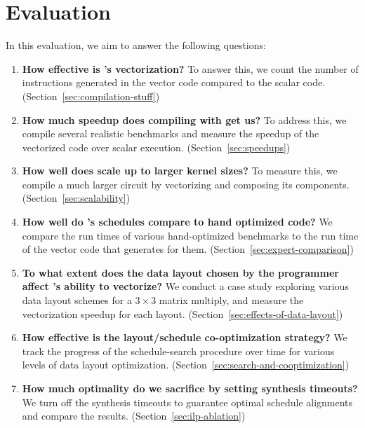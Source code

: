 \section{Evaluation}\label{sec:eval}


In this evaluation, we aim to answer the following questions:

\begin{enumerate}
    \item {\bf How effective is \system's vectorization?} To answer this, we count the number of instructions generated in the vector code compared to the scalar code. (Section~\ref{sec:compilation-stuff})
    \item {\bf How much speedup does compiling with \system get us?} To address this, we compile several realistic benchmarks and measure the speedup of the vectorized code over scalar execution. (Section~\ref{sec:speedups})
    \item {\bf How well does {\system} scale up to larger kernel sizes?} To measure this, we compile a much larger circuit by vectorizing and composing its components. (Section~{\ref{sec:scalability}}) %
    \item {\bf How well do \system's schedules compare to hand optimized code?} We compare the run times of various hand-optimized benchmarks to the run time of the vector code that \system generates for them. (Section~\ref{sec:expert-comparison})
    \item {\bf To what extent does the data layout chosen by the programmer affect \system's ability to vectorize?} We conduct a case study exploring various data layout schemes for a $3\times 3$ matrix multiply, and measure the vectorization speedup for each layout. (Section~\ref{sec:effects-of-data-layout})
   \item {\bf How effective is the layout/schedule co-optimization strategy?} We track the progress of the schedule-search procedure over time for various levels of data layout optimization. (Section~{\ref{sec:search-and-cooptimization}})
   \item {\bf How much optimality do we sacrifice by setting synthesis timeouts?} We turn off the synthesis timeouts to guarantee optimal schedule alignments and compare the results. (Section~{\ref{sec:ilp-ablation}})
\end{enumerate}


